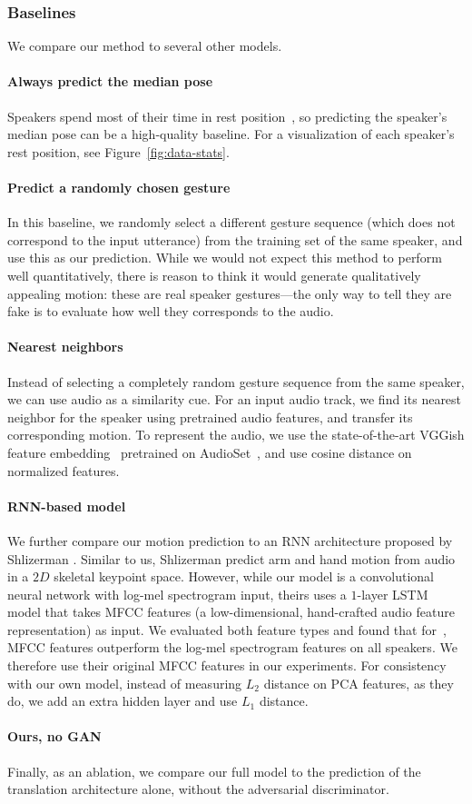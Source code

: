 \documentclass[10pt,twocolumn,letterpaper]{article}
\newcommand{\mypar}[1]{\vspace{-2mm}\paragraph{#1}}
\begin{document}
\subsubsection{Baselines}
\label{sec:baselines}
We compare our method to several other models. 
\vspace{-3mm}
\mypar{Always predict the median pose} Speakers spend most of their time in rest position~\cite{kendon_2004}, so predicting the speaker's median pose can be a high-quality baseline. For a visualization of each speaker's rest position, see Figure~\ref{fig:data-stats}.
\vspace{-3mm}
\mypar{Predict a randomly chosen gesture} In this baseline, we randomly select a different gesture sequence (which does not correspond to the input utterance) from the training set of the same speaker, and use this as our prediction. While we would not expect this method to perform well quantitatively, there is reason to think it would generate qualitatively appealing motion: these are real speaker gestures---the only way to tell they are fake is to evaluate how well they corresponds to the audio.
\vspace{-3mm}
\mypar{Nearest neighbors} Instead of selecting a completely random gesture sequence from the same speaker, we can use audio as a similarity cue. For an input audio track, we find its nearest neighbor for the speaker using pretrained audio features, and transfer its corresponding motion. To represent the audio, we use the state-of-the-art VGGish feature embedding~\cite{vggish} pretrained on AudioSet~\cite{gemmeke2017audio}, and use cosine distance on normalized features. 
\vspace{-3mm}
\mypar{RNN-based model~\cite{shlizermanaudio}} We further compare our motion prediction to an RNN architecture proposed by Shlizerman \etal. Similar to us, Shlizerman \etal predict arm and hand motion from audio in a $2D$ skeletal keypoint space. However, while our model is a convolutional neural network with log-mel spectrogram input, theirs uses a 
$1$-layer LSTM model that takes MFCC features (a low-dimensional, hand-crafted audio feature representation) as input.
We evaluated both feature types and found that for~\cite{shlizermanaudio}, MFCC features outperform the log-mel spectrogram features on all speakers. We therefore use their original MFCC features in our experiments.
For consistency with our own model, instead of measuring $L_2$ distance on PCA features, as they do, we add an extra hidden layer and use $L_1$ distance.
\vspace{-3mm}
\mypar{Ours, no GAN} Finally, as an ablation, we compare our full model to the prediction of the translation architecture alone, without the adversarial discriminator.
\end{document}
